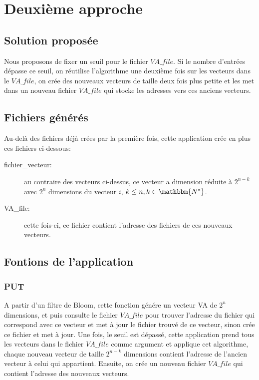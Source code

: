 \documentclass[a4paper,12pt]{report}
\begin{document}
\chapter{Deuxième approche}
\section{Solution proposée}
	Nous proposons de fixer un seuil pour le fichier $VA\_file$. Si le nombre d'entrées dépasse ce seuil, on réutilise l'algorithme une deuxième fois sur les vecteurs dans le $VA\_file$, on crée des nouveaux vecteurs de taille deux fois plus petite et les met dans un nouveau fichier $VA\_file$ qui stocke les adresses vers ces anciens vecteurs.
	
\section{Fichiers générés}
	Au-delà des fichiers déjà crées par la première fois, cette application crée en plus ces fichiers ci-dessous:
	\begin{description}
		\item[fichier\_vecteur:] au contraire des vecteurs ci-dessus, ce vecteur a dimension réduite à $2^{n-k}$ avec $2^n$ dimensions du vecteur $i$, $k \leq n, k \in \mathbbm{N^*}$.
		\item[VA\_file: ] cette fois-ci, ce fichier contient l'adresse des fichiers de ces nouveaux vecteurs.
	\end{description}
	
\section{Fontions de l'application}
\subsection{PUT}
	A partir d'un filtre de Bloom, cette fonction génére un vecteur VA de $2^n$ dimensions, et puis consulte le fichier $VA\_file$ pour trouver l'adresse du fichier qui correspond avec ce vecteur et met à jour le fichier trouvé de ce vecteur, sinon crée ce fichier et met à jour. Une fois, le seuil est dépassé, cette application prend tous les vecteurs dans le fichier $VA\_file$ comme argument et applique cet algorithme, chaque nouveau vecteur de taille $2^{n-k}$ dimensions contient l'adresse de l'ancien vecteur à celui qui appartient. Ensuite, on crée un nouveau fichier $VA\_file$ qui contient l'adresse des nouveaux vecteurs.
	
\end{document}

